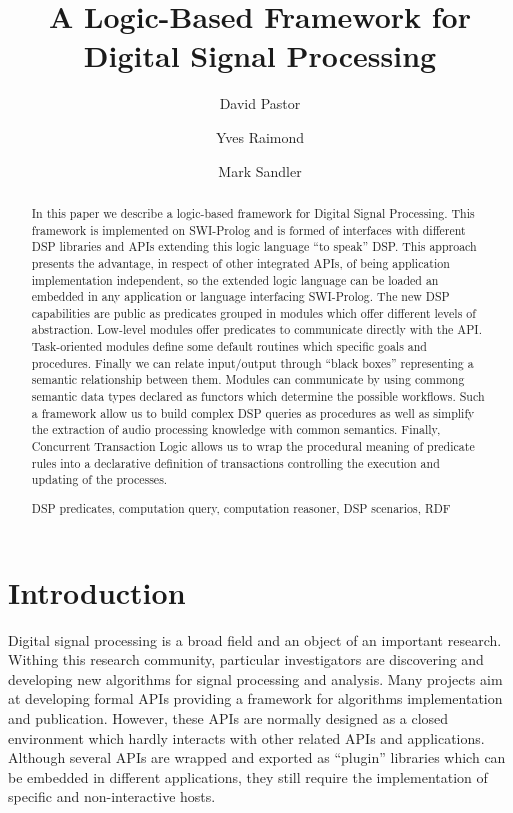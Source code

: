 \documentclass[runningheads]{llncs}
\newcommand{\keywords}[1]{\par\addvspace\baselineskip
\noindent\keywordname\enspace\ignorespaces#1}
\begin{document}
\mainmatter

\title{A Logic-Based Framework for Digital Signal Processing}


\author{David Pastor\and Yves Raimond\and Mark Sandler}


\maketitle


\begin{abstract}
In this paper we describe a logic-based framework for Digital Signal Processing. This framework is implemented on SWI-Prolog and is formed of interfaces with different DSP libraries and APIs extending this logic language ``to speak'' DSP. This approach presents the advantage, in respect of other integrated APIs, of being application implementation independent, so the extended logic language can be loaded an embedded in any application or language interfacing SWI-Prolog. The new DSP capabilities are public as predicates grouped in modules which offer different levels of abstraction. Low-level modules offer predicates to communicate directly with the API. Task-oriented modules define some default routines which specific goals and procedures. Finally we can relate input/output through ``black boxes'' representing a semantic relationship between them. Modules can communicate by using commong semantic data types declared as functors which determine the possible workflows. Such a framework allow us to build complex DSP queries as procedures as well as simplify the extraction of audio processing knowledge with common semantics. Finally, Concurrent Transaction Logic allows us to wrap the procedural meaning of predicate rules into a declarative definition of transactions controlling the execution and updating of the processes.
\keywords{DSP predicates, computation query, computation reasoner, DSP scenarios, RDF}
\end{abstract}

\section{Introduction}\label{sec:intro}

Digital signal processing is a broad field and an object of an important research. Withing this research community, particular investigators are discovering and developing new algorithms for signal processing and analysis. Many projects aim at developing formal APIs providing a framework for algorithms implementation and publication. However, these APIs are normally designed as a closed environment which hardly interacts with other related APIs and applications. Although several APIs are wrapped and exported as ``plugin'' libraries which can be embedded in different applications, they still require the implementation of specific and non-interactive hosts.
\end{document}
